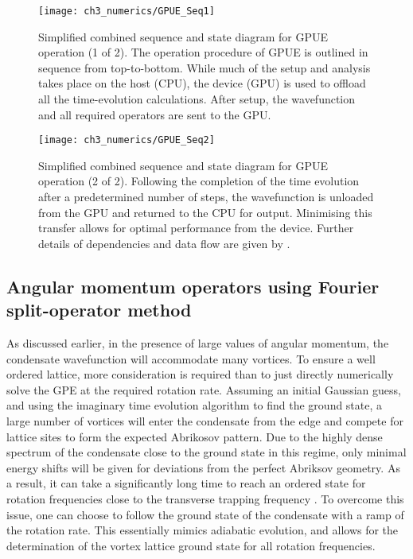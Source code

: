 \begin{figure}[]
    \centering
        \texttt{[image: ch3\_numerics/GPUE\_Seq1]}
    \caption{Simplified combined sequence and state diagram for GPUE operation (1 of 2). The operation procedure of GPUE is outlined in sequence from top-to-bottom. While much of the setup and analysis takes place on the host (CPU), the device (GPU) is used to offload all the time-evolution calculations. After setup, the wavefunction and all required operators are sent to the GPU.}
    \label{fig:gpue_seq1}
\end{figure}
\begin{figure}[]
    \centering
        \texttt{[image: ch3\_numerics/GPUE\_Seq2]}
    \caption{Simplified combined sequence and state diagram for GPUE operation (2 of 2). Following the completion of the time evolution after a predetermined number of steps, the wavefunction is unloaded from the GPU and returned to the CPU for output. Minimising this transfer allows for optimal performance from the device. Further details of dependencies and data flow are given by \cite[docs/gpue.pdf]{MLXD_GPUE}.}
    \label{fig:gpue_seq2}
\end{figure}

\subsection{Angular momentum operators using Fourier split-operator  method}\label{ss:ang_mom_fso}
As discussed earlier, in the presence of large values of angular momentum, the condensate wavefunction will accommodate many vortices. To ensure a well ordered lattice, more consideration is required than to just directly numerically solve the GPE at the required rotation rate. Assuming an initial Gaussian guess, and using the imaginary time evolution algorithm to find the ground state, a large number of vortices will enter the condensate from the edge and compete for lattice sites to form the expected Abrikosov pattern. Due to the highly dense spectrum of the condensate close to the ground state in this regime, only minimal energy shifts will be given for deviations from the perfect Abriksov geometry. As a result, it can take a significantly long time to reach an ordered state for rotation frequencies close to the transverse trapping frequency \cite{Vtx:Mueller_prl_2002}. To overcome this issue, one can choose to follow the ground state of the condensate with a ramp of the rotation rate. This essentially mimics adiabatic evolution, and allows for the determination of the vortex lattice ground state for all rotation frequencies.

